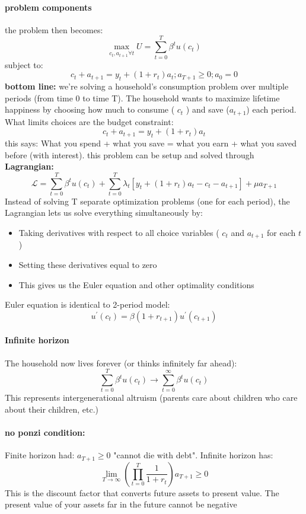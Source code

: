 \documentclass[12pt]{article}
\begin{document}
\paragraph{problem components}
the problem then becomes:
$$
\max _{c_t, a_{t+1} \forall t} U=\sum_{t=0}^T \beta^t u\left(c_t\right)
$$
subject to: $$
c_t+a_{t+1}=y_t+\left(1+r_t\right) a_t ; a_{T+1} \geq 0 ; a_0=0
$$
\textbf{bottom line: }we're solving a household's consumption problem over multiple periods (from time 0 to time T). The household wants to maximize lifetime happiness by choosing how much to consume ( $c_t$ ) and save ($a_{t+1}$) each period. What limits choices are the budget constraint:
$$
c_t+a_{t+1}=y_t+\left(1+r_t\right) a_t
$$
this says: What you spend + what you save = what you earn + what you saved before (with interest). this problem can be setup and solved through \textbf{Lagrangian:}
$$
\mathcal{L}=\sum_{t=0}^T \beta^t u\left(c_t\right)+\sum_{t=0}^T \lambda_t\left[y_t+\left(1+r_t\right) a_t-c_t-a_{t+1}\right]+\mu a_{T+1}
$$
Instead of solving T separate optimization problems (one for each period), the Lagrangian lets us solve everything simultaneously by:
\begin{itemize}
    \item Taking derivatives with respect to all choice variables ( $c_t$ and $a_{t+1}$ for each $t$ )
    \item Setting these derivatives equal to zero
    \item This gives us the Euler equation and other optimality conditions
\end{itemize}
Euler equation is identical to 2-period model:
$$
u^{\prime}\left(c_t\right)=\beta\left(1+r_{t+1}\right) u^{\prime}\left(c_{t+1}\right)
$$
\paragraph{Infinite horizon}
The household now lives forever (or thinks infinitely far ahead):
$$
\sum_{t=0}^T \beta^t u\left(c_t\right) \rightarrow \sum_{t=0}^{\infty} \beta^t u\left(c_t\right)
$$
This represents intergenerational altruism (parents care about children who care about their children, etc.)
\paragraph{no ponzi condition:}
Finite horizon had: $a_{T+1} \geq 0$ "cannot die with debt". Infinite horizon has:
$$
\lim _{T \rightarrow \infty}\left(\prod_{t=0}^T \frac{1}{1+r_t}\right) a_{T+1} \geq 0
$$
This is the discount factor that converts future assets to present value. The present value of your assets far in the future cannot be negative
\end{document}
